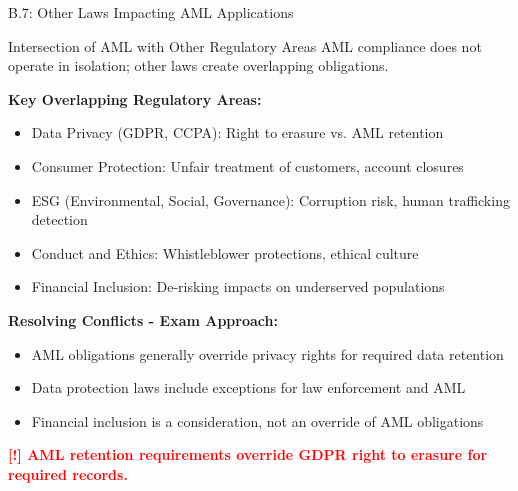\documentclass[11pt,a4paper]{beamer}
\newcommand{\redflag}[1]{\textcolor{red}{\textbf{[!] #1}}}
\begin{document}
	\begin{frame}{B.7: Other Laws Impacting AML Applications}
		\begin{block}{Intersection of AML with Other Regulatory Areas}
			AML compliance does not operate in isolation; other laws create overlapping obligations.
		\end{block}
		\textbf{Key Overlapping Regulatory Areas:}
		\begin{itemize}
			\item Data Privacy (GDPR, CCPA): Right to erasure vs. AML retention
			\item Consumer Protection: Unfair treatment of customers, account closures
			\item ESG (Environmental, Social, Governance): Corruption risk, human trafficking detection
			\item Conduct and Ethics: Whistleblower protections, ethical culture
			\item Financial Inclusion: De-risking impacts on underserved populations
		\end{itemize}
		\textbf{Resolving Conflicts - Exam Approach:}
		\begin{itemize}
			\item AML obligations generally override privacy rights for required data retention
			\item Data protection laws include exceptions for law enforcement and AML
			\item Financial inclusion is a consideration, not an override of AML obligations
		\end{itemize}
		\redflag{AML retention requirements override GDPR right to erasure for required records.}
	\end{frame}
	
\end{document}
